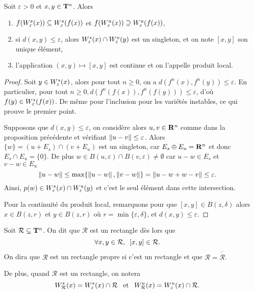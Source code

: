   \begin{proposition}
    Soit $\varepsilon > 0$ et $x, y \in \T^n$. Alors
    \begin{enumerate}
      \item $f(\Ws{x}) \subseteq \Ws{f(x)}$ et $f(\Wu{x}) \supseteq \Wu{f(x)}$,
      \item si $d(x, y) \leq \varepsilon$, alors $\Ws{x} \cap \Wu{y}$ est un singleton, et on note $[x, y]$ son unique élément,
      \item l'application $(x, y) \mapsto [x, y]$ est continue et on l'appelle produit local.
    \end{enumerate}
  \end{proposition}

  \begin{proof}
    Soit $y \in \Ws{x}$, alors pour tout $n \geq 0$, on a $d(f^n(x), f^n(y)) \leq \varepsilon$.
    En particulier, pour tout $n \geq 0, d(f^n(f(x)), f^n(f(y))) \leq \varepsilon$, d'où $f(y) \in \Ws{f(x)}$.
    De même pour l'inclusion pour les variétés instables, ce qui prouve le premier point.

    Supposons que $d(x, y) \leq \varepsilon$,
    on considère alors $u, v \in \R^n$ comme dans la proposition précédente et vérifiant $\No{u - v} \leq \varepsilon$.
    Alors $\{w\} = (u + E_s) \cap (v + E_u)$ est un singleton,
    car $E_s \oplus E_u = \R^n$ et donc $E_s \cap E_u = \{0\}$.
    De plus $w \in B(u, \varepsilon) \cap B(v, \varepsilon) \not= \emptyset$ car
    $u - w \in E_s$ et $v - w \in E_u$
    $$\No{u - w} \leq \max\{\No{u-w}, \No{v- w}\} = \No{u - w + w - v} \leq \varepsilon.$$
    Ainsi, $p(w) \in \Ws{x} \cap \Wu{y}$ et c'est le seul élément dans cette intersection.

    Pour la continuité du produit local, remarquons pour que $[x, y] \in B(z, \delta)$ alors $x \in B(z, r)$ et $y \in B(z, r)$
    où $r = \min\{\varepsilon, \delta\}$, et $d(x, y) \leq \varepsilon$.
  \end{proof}

  \begin{definition}
    Soit $\mathcal R \subseteq \T^n$. On dit que $\mathcal R$ est un rectangle dès lors que
    $$\forall x, y \in \mathcal R, \hspace{0.5em} [x, y] \in \mathcal R.$$
    On dira que $\mathcal R$ est un rectangle propre si c'est un rectangle et que $ \mathcal R = \overline{\mathring{\mathcal R}}$.

    De plus, quand $\mathcal R$ est un rectangle, on notera
    $$\Ws[\mathcal R]{x} = \Ws{x} \cap \mathcal R \hspace{0.8em}\text{et}\hspace{0.8em} \Wu[\mathcal R]{x} = \Wu{x} \cap \mathcal R.$$
  \end{definition}

